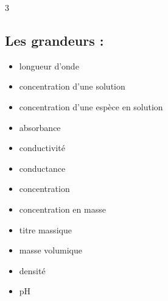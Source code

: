 \documentclass[a4paper,11pt,fleqn]{article}%
\begin{document}
\begin{multicols}{3}
\subsection*{Les grandeurs :}
    \begin{itemize}[label=$\square$, itemsep=0pt]
        \item longueur d'onde
        \item concentration d'une solution
        \item concentration d'une espèce en solution
        \item absorbance
        \item conductivité
        \item conductance
        \item concentration
        \item concentration en masse
        \item titre massique
        \item masse volumique
        \item densité
        \item pH
    \end{itemize}
\end{multicols}
\end{document}
